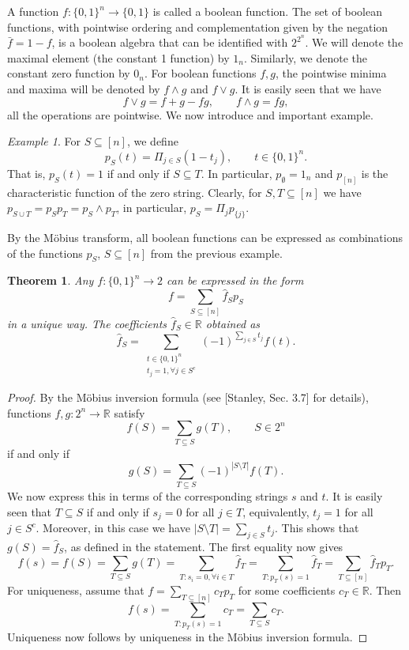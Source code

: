 \documentclass[12pt]{article}
\newtheorem{theorem}{Theorem}
\theoremstyle{definition}
\theoremstyle{remark}
\newtheorem{exm}{Example}
\begin{document}
A function $f:\{0,1\}^n\to \{0,1\}$ is called a boolean function. 
The set of boolean functions, with pointwise ordering and complementation given by the
negation $\bar f=1-f$,  is a boolean algebra that can be identified with $2^{2^n}$.
We will denote the maximal element (the constant 1 function) by $1_n$. Similarly,
we denote the constant zero function by $0_n$.  For boolean
functions $f,g$, the pointwise minima and maxima will be denoted by $f\wedge g$ and $f\vee
g$. It is easily seen that we have
\begin{equation}\label{eq:wedgevee_fun}
f\vee g= f+g-fg,\qquad f\wedge g=fg,
\end{equation}
all the operations are pointwise. We now introduce and important example. 


\begin{exm}\label{ex:pS}
For $S\subseteq [n]$, we define
\[
p_S(t)=\Pi_{j\in S}(1-t_j),\qquad t\in \{0,1\}^n.
\]
That is, $p_S(t)=1$ if and only if $S\subseteq T$. In particular,
$p_\emptyset=1_n$ and $p_{[n]}$ is the characteristic function of the zero string.
Clearly, for $S,T\subseteq [n]$ we have $p_{S\cup T}=p_Sp_T=p_S\wedge p_T$, in particular,
$p_S=\Pi_jp_{\{j\}}$. 
\end{exm}

By the M\"obius transform, all boolean functions can be expressed as combinations of the functions $p_S$, $S\subseteq
[n]$ from the previous example.

\begin{theorem}\label{thm:mobius} Any $f:\{0,1\}^n\to 2$ can be expressed  in the form 
\[
f=\sum_{S\subseteq [n]} \hat f_Sp_S
\]
in a unique way. The coefficients  $\hat f_S\in \mathbb R$ obtained as
\[
\hat f_S=\sum_{\substack{t\in \{0,1\}^n\\ t_j=1, \forall  j\in S^c}} (-1)^{\sum_{j\in
S}t_j}f(t).
\]

\end{theorem}

\begin{proof}  By the M\"obius inversion formula (see [Stanley, Sec. 3.7] for details),
functions $f, g: 2^n\to \mathbb R$ satisfy
\[
f(S)=\sum_{T\subseteq S} g(T),\qquad S\in 2^n
\]
if and only if 
\[
g(S)=\sum_{T\subseteq S}(-1)^{|S\setminus T|} f(T).
\]
We now express this in terms of the corresponding strings $s$ and $t$.
It is easily seen that $T\subseteq S$ if and only if
$s_j=0$ for all $j\in T$, equivalently, $t_j=1$ for all $j\in S^c$. Moreover,
in this case we have  $|S\setminus T|=\sum_{j\in S} t_j$. This shows that $g(S)=\hat f_S$,
as defined in the statement. The first equality now gives
\[
f(s)=f(S)=\sum_{T\subseteq S} g(T)=\sum_{T:s_i=0,\forall i\in T}\hat f_T=\sum_{T:
p_T(s)=1}\hat f_T=\sum_{T\subseteq [n]} \hat f_Tp_T.
\]
For uniqueness, assume that $f=\sum_{T\subseteq [n]} c_Tp_T$ for some coefficients $c_T\in
\mathbb R$. Then 
\[
f(s)=\sum_{T: p_T(s)=1}c_T=\sum_{T\subseteq S}c_T.
\]
Uniqueness now follows by  uniqueness in the M\"obius inversion formula.

\end{proof}
\end{document}
